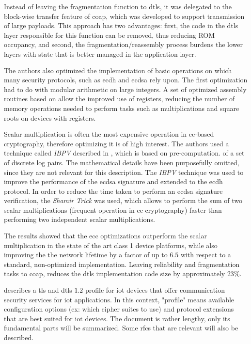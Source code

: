 \documentclass{llncs}
\begin{document}
Instead of leaving the fragmentation function to \gls{dtls}, it was
delegated to the block-wise transfer feature of \gls{coap}\cite{RFC7959}, which was developed
to support transmission of large payloads. This approach has two advantages: first, the code in the \gls{dtls}
layer responsible for this function can be removed, thus reducing ROM occupancy,
and second, the fragmentation/reassembly process burdens the lower layers
with state that is better managed in the application layer.

The authors also optimized the implementation of basic operations on which
many security protocols, such as \gls{ecdh} and \gls{ecdsa} rely upon. The first
optimization had to do with modular arithmetic on large integers. A set of optimized
assembly routines based on \cite{Comparin25:Online} allow the improved use of
registers, reducing the number of memory operations needed to perform
tasks such as multiplications and square roots on devices with  registers.

Scalar multiplication is often the most expensive operation in \gls{ec}-based
cryptography, therefore optimizing it is of high interest. The authors used a
technique called \textit{IBPV} described in \cite{LowcostS87:online}, which is based on pre-computation.
of a set of discrete log pairs. The mathematical details have been purposefully omitted,
since they are not relevant for this description. The \textit{IBPV} technique was used
to improve the performance of the \gls{ecdsa} signature and extended to the
\gls{ecdh} protocol. In order to reduce the time taken to perform an \gls{ecdsa}
signature verification, the \textit{Shamir Trick} was used, which allows
to perform the sum of two scalar multiplications (frequent operation in \gls{ec} cryptography)
faster than performing two independent scalar multiplications.

The results showed that the \gls{ecc} optimizations
outperform the scalar multiplication in the state of the art class 1 device platforms,
while also improving the the network lifetime by a factor of up to $6.5$ with
respect to a standard, non-optimized implementation. Leaving reliability and
fragmentation tasks to \gls{coap}, reduces the \gls{dtls} implementation code size
by approximately $23\%$.

\cite{RFC7925} describes a \gls{tls} and \gls{dtls} $1.2$
profile for \gls{iot} devices that offer communication security services
for \gls{iot} applications.
In this context, "profile" means available configuration options (ex: which
cipher suites to use) and protocol extensions that are best suited for \gls{iot} devices.
The document is rather lengthy, only its fundamental parts will be summarized. Some \gls{rfc}s that are relevant will also be described.
\end{document}
